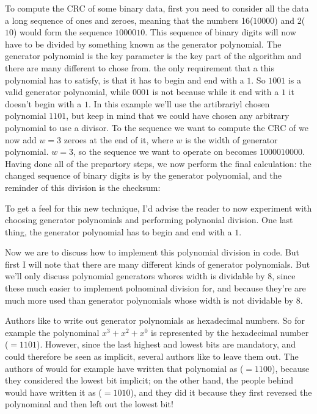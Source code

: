To compute the CRC of some binary data, first you need to consider all
the data a long sequence of ones and zeroes, meaning that the numbers
16($10000$) and 2($10$) would form the sequence $1000010$. This
sequence of binary digits will now have to be divided by something
known as the generator polynomial. The generator polynomial is the key
parameter is the key part of the algorithm and there are many
different to chose from. the only requirement that a this polynomial
has to satisfy, is that it has to begin and end with a $1$. So $1001$
is a valid generator polynomial, while $0001$ is not because while it
end with a $1$ it doesn't begin with a $1$. In this example we'll use
the artibrariyl chosen polynomial $1101$, but keep in mind that we
could have chosen any arbitrary polynomial to use a divisor. To the
sequence we want to compute the CRC of we now add $w=3$ zeroes at the
end of it, where $w$ is the width of generator polynomial. $w=3$, so
the sequence we want to operate on becomes $1000010000$. Having done
all of the prepartory steps, we now perform the final calculation: the
changed sequence of binary digits is by the generator polynomial, and
the reminder of this division is the checksum:


To get a feel for this new technique, I'd advise the reader to now
experiment with choosing generator polynomials and performing
polynonial division. One last thing, the generator polynomial has to
begin and end with a $1$.

Now we are to discuss how to implement this polynomial division in
code. But first I will note that there are many different kinds of
generator polynomials. But we'll only discuss polynomial generators
whores width is dividable by 8, since these much easier to implement
polnominal division for, and because they're are much more used than
generator polynomials whose width is not dividable by $8$.

Authors like to write out generator polynomials as hexadecimal
numbers. So for example the polynominal $x^3 + x^2 + x^0$ is
represented by the hexadecimal number ($=1101$). However, since
the last highest and lowest bits are mandatory, and could therefore be
seen as implicit, several authors like to leave them out. The authors
of \cite{Koopman04cyclicredundancy_embedded_networks} would for
example have written that polynomial as ($=1100$), because they
considered the lowest bit implicit; on the other hand, the people
behind \cite{press2007numerical_recipes} would have written it as
($=1010$), and they did it because they first reversed the
polynominal and then left out the lowest bit!

